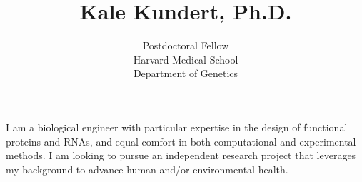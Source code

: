 \documentclass{article}
\title{Kale Kundert, Ph.D.}
\author{Postdoctoral Fellow\\Harvard Medical School\\Department of Genetics}
\date{}
\begin{document}
 \maketitle

 \pagestyle{empty}
 \thispagestyle{empty}

 I am a biological engineer with particular expertise in the design of 
 functional proteins and RNAs, and equal comfort in both computational and 
 experimental methods.  I am looking to pursue an independent research project 
 that leverages my background to advance human and/or environmental health.
 
 
 
 
 
 
 
 
 
 
 
\end{document}
